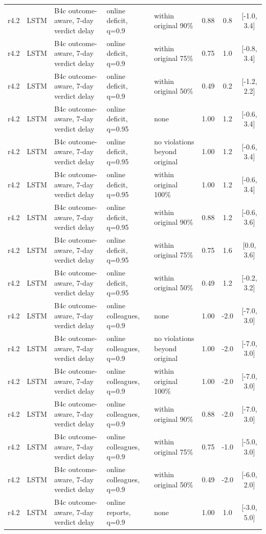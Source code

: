 \begin{longtable}{lllp{4.2cm}p{3.4cm}ccc}
r4.2 & LSTM & B4c outcome-aware, 7-day verdict delay & online deficit, q=0.9 & within original 90\% & 0.88 & 0.8 & [-1.0, 3.4] \\
r4.2 & LSTM & B4c outcome-aware, 7-day verdict delay & online deficit, q=0.9 & within original 75\% & 0.75 & 1.0 & [-0.8, 3.4] \\
r4.2 & LSTM & B4c outcome-aware, 7-day verdict delay & online deficit, q=0.9 & within original 50\% & 0.49 & 0.2 & [-1.2, 2.2] \\
r4.2 & LSTM & B4c outcome-aware, 7-day verdict delay & online deficit, q=0.95 & none & 1.00 & 1.2 & [-0.6, 3.4] \\
r4.2 & LSTM & B4c outcome-aware, 7-day verdict delay & online deficit, q=0.95 & no violations beyond original & 1.00 & 1.2 & [-0.6, 3.4] \\
r4.2 & LSTM & B4c outcome-aware, 7-day verdict delay & online deficit, q=0.95 & within original 100\% & 1.00 & 1.2 & [-0.6, 3.4] \\
r4.2 & LSTM & B4c outcome-aware, 7-day verdict delay & online deficit, q=0.95 & within original 90\% & 0.88 & 1.2 & [-0.6, 3.6] \\
r4.2 & LSTM & B4c outcome-aware, 7-day verdict delay & online deficit, q=0.95 & within original 75\% & 0.75 & 1.6 & [0.0, 3.6] \\
r4.2 & LSTM & B4c outcome-aware, 7-day verdict delay & online deficit, q=0.95 & within original 50\% & 0.49 & 1.2 & [-0.2, 3.2] \\
r4.2 & LSTM & B4c outcome-aware, 7-day verdict delay & online colleagues, q=0.9 & none & 1.00 & -2.0 & [-7.0, 3.0] \\
r4.2 & LSTM & B4c outcome-aware, 7-day verdict delay & online colleagues, q=0.9 & no violations beyond original & 1.00 & -2.0 & [-7.0, 3.0] \\
r4.2 & LSTM & B4c outcome-aware, 7-day verdict delay & online colleagues, q=0.9 & within original 100\% & 1.00 & -2.0 & [-7.0, 3.0] \\
r4.2 & LSTM & B4c outcome-aware, 7-day verdict delay & online colleagues, q=0.9 & within original 90\% & 0.88 & -2.0 & [-7.0, 3.0] \\
r4.2 & LSTM & B4c outcome-aware, 7-day verdict delay & online colleagues, q=0.9 & within original 75\% & 0.75 & -1.0 & [-5.0, 3.0] \\
r4.2 & LSTM & B4c outcome-aware, 7-day verdict delay & online colleagues, q=0.9 & within original 50\% & 0.49 & -2.0 & [-6.0, 2.0] \\
r4.2 & LSTM & B4c outcome-aware, 7-day verdict delay & online reports, q=0.9 & none & 1.00 & 1.0 & [-3.0, 5.0] \\

\end{longtable}
